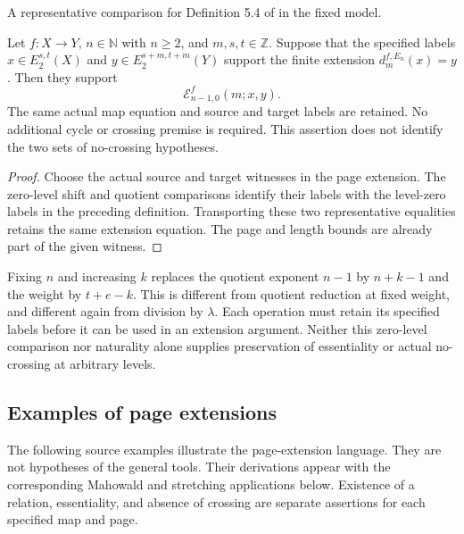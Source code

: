 \begin{theorem}
\label{sem:ProofTools:extension-level-zero}
A representative comparison for Definition 5.4 of \cite{LWX126} in the
fixed model.\par
Let $f:X\to Y$, $n\in\mathbb N$ with $n\geq2$, and
$m,s,t\in\mathbb Z$. Suppose that the specified labels
$x\in E_2^{s,t}(X)$ and $y\in E_2^{s+m,t+m}(Y)$ support the
finite extension $d_m^{f,E_n}(x)=y$. Then they support
\[
\mathcal E^f_{n-1,0}(m;x,y).
\]
The same actual map equation and source and target labels are retained.
No additional cycle or crossing premise is required. This assertion
does not identify the two sets of no-crossing hypotheses.
\end{theorem}
\begin{proof}
Choose the actual source and target witnesses in the page extension.
The zero-level shift and quotient comparisons identify their labels
with the level-zero labels in the preceding definition. Transporting
these two representative equalities retains the same extension equation.
The page and length bounds are already part of the given witness.
\end{proof}

Fixing $n$ and increasing $k$ replaces the quotient exponent $n-1$
by $n+k-1$ and the weight by $t+e-k$. This is different from quotient
reduction at fixed weight, and different again from division by
$\lambda$. Each operation must retain its specified labels before it
can be used in an extension argument. Neither this zero-level comparison
nor naturality alone supplies preservation of essentiality or actual
no-crossing at arbitrary levels.

\subsection{Examples of page extensions}

The following source examples illustrate the page-extension language.
They are not hypotheses of the general tools. Their derivations appear
with the corresponding Mahowald and stretching applications below.
Existence of a relation, essentiality, and absence of crossing are
separate assertions for each specified map and page.

